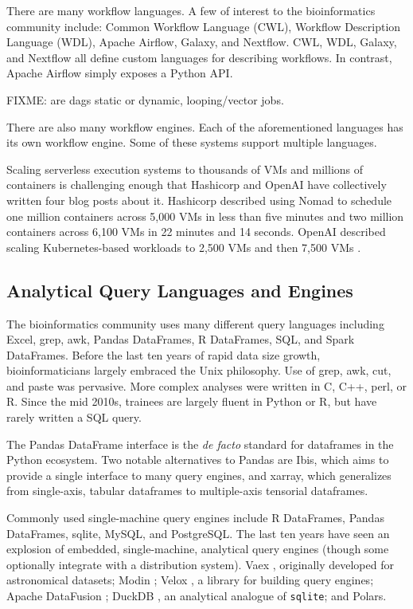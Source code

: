 \documentclass[10pt,a4paper%
]{article}
\begin{document}

There are many workflow languages. A few of interest to the bioinformatics community include: Common
Workflow Language (CWL), Workflow Description Language (WDL), Apache Airflow, Galaxy, and
Nextflow. CWL, WDL, Galaxy, and Nextflow all define custom languages for describing workflows. In
contrast, Apache Airflow simply exposes a Python API.

FIXME: are dags static or dynamic, looping/vector jobs.

There are also many workflow engines. Each of the aforementioned languages has its own workflow
engine. Some of these systems support multiple languages.

Scaling serverless execution systems to thousands of VMs and millions of containers is challenging
enough that Hashicorp and OpenAI have collectively written four blog posts about it. Hashicorp
described using Nomad to schedule one million containers across 5,000 VMs in less than five minutes
\cite{hashicorp1m} and two million containers across 6,100 VMs in 22 minutes and 14 seconds. OpenAI
described scaling Kubernetes-based workloads to 2,500 VMs \cite{openai2500} and then 7,500 VMs
\cite{openai7500}.

\subsection{Analytical Query Languages and Engines}

The bioinformatics community uses many different query languages including Excel, grep, awk, Pandas
DataFrames, R DataFrames, SQL, and Spark DataFrames. Before the last ten years of rapid data size
growth, bioinformaticians largely embraced the Unix philosophy. Use of grep, awk, cut, and paste was
pervasive. More complex analyses were written in C, C++, perl, or R. Since the mid 2010s, trainees
are largely fluent in Python or R, but have rarely written a SQL query.

The Pandas DataFrame interface is the \emph{de facto} standard for dataframes in the Python
ecosystem. Two notable alternatives to Pandas are Ibis, which aims to provide a single interface to
many query engines, and xarray, which generalizes from single-axis, tabular dataframes to
multiple-axis tensorial dataframes.

Commonly used single-machine query engines include R DataFrames, Pandas DataFrames, sqlite, MySQL,
and PostgreSQL. The last ten years have seen an explosion of embedded, single-machine, analytical
query engines (though some optionally integrate with a distribution system). Vaex \cite{vaex},
originally developed for astronomical datasets; Modin \cite{modin}; Velox \cite{velox}, a library
for building query engines; Apache DataFusion \cite{datafusion}; DuckDB \cite{duckdb}, an analytical
analogue of \texttt{sqlite}; and Polars.
\end{document}
